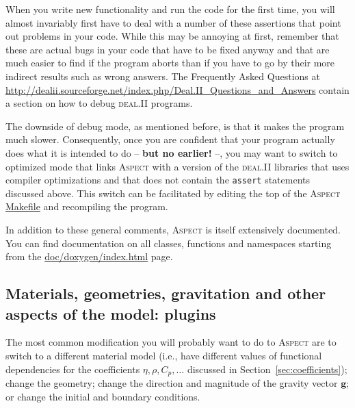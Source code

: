\documentclass{article}
\newcommand{\dealii}{{\textsc{deal.II}}}
\newcommand{\aspect}{\textsc{Aspect}}
\begin{document}
When you write new functionality and run
the code for the first time, you will almost invariably first have to deal
with a number of these assertions that point out problems in your code. While
this may be annoying at first, remember that these are actual bugs in your
code that have to be fixed anyway and that are much easier to find if the
program aborts than if you have to go by their more indirect results such as
wrong answers. The Frequently Asked Questions at
\url{http://dealii.sourceforge.net/index.php/Deal.II_Questions_and_Answers}
contain a section on how to debug \dealii{} programs.

The downside of debug mode, as mentioned before, is that it makes the program
much slower. Consequently, once you are
confident that your program actually does what it is intended to do --
\textbf{but no earlier!} --, you may want to switch to optimized mode that
links \aspect{} with a version of the \dealii{} libraries that uses compiler
optimizations and that does not contain the \texttt{assert} statements
discussed above. This switch can be facilitated by editing the top of the
\aspect{} \url{Makefile} and recompiling the program.

In addition to these general comments, \aspect{} is itself extensively
documented. You can find documentation on all classes, functions and
namespaces starting from the \url{doc/doxygen/index.html} page.


\subsection{Materials, geometries, gravitation and other aspects of the model:
  plugins}
\label{sec:plugins}

The most common modification you will probably want to do to \aspect{} are to
switch to a different material model (i.e., have different values of
functional dependencies for the coefficients $\eta,\rho,C_p, \ldots$ discussed
in Section~\ref{sec:coefficients}); change the geometry; change the direction
and magnitude of the gravity vector $\mathbf g$; or change the initial and
boundary conditions.
\end{document}
